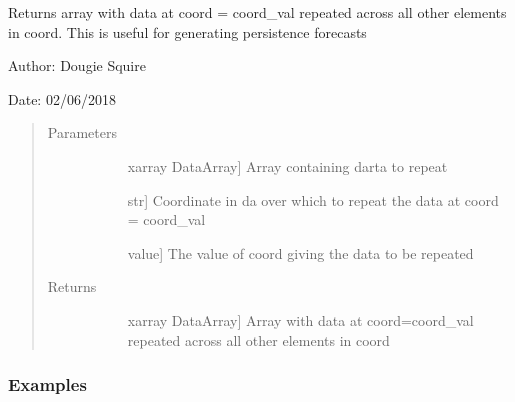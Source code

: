 \documentclass[letterpaper,10pt,english]{sphinxmanual}
\begin{document}
\begin{fulllineitems}
\label{\detokenize{utils_doc:utils.repeat_datapoint}}
Returns array with data at coord = coord\_val repeated across all other elements in coord.                 This is useful for generating persistence forecasts

\begin{DUlineblock}{0em}
\item[] Author: Dougie Squire
\item[] Date: 02/06/2018
\end{DUlineblock}
\begin{quote}\begin{description}
\item[{Parameters}] \leavevmode\begin{description}
\item[{}] \leavevmode{[}xarray DataArray{]}
Array containing darta to repeat

\item[{}] \leavevmode{[}str{]}
Coordinate in da over which to repeat the data at coord = coord\_val

\item[{}] \leavevmode{[}value{]}
The value of coord giving the data to be repeated

\end{description}

\item[{Returns}] \leavevmode\begin{description}
\item[{}] \leavevmode{[}xarray DataArray{]}
Array with data at coord=coord\_val repeated across all other elements in coord

\end{description}

\end{description}\end{quote}
\subsubsection*{Examples}


\end{fulllineitems}
\end{document}
